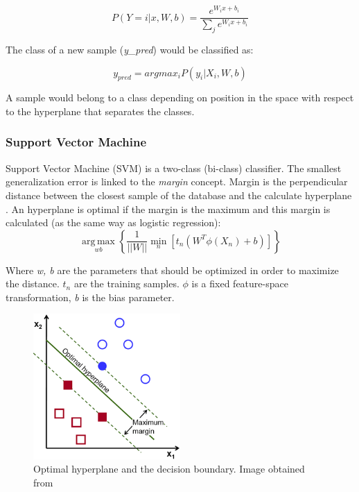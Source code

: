 \begin{equation}
P(Y=i|x,W,b) = \frac{e^{W_ix+b_i}}{\sum_j e^{W_ix+b_i}}
\end{equation}

The class of a new sample (\textit{y\_{pred}}) would be classified as:

\begin{equation}
y_{pred} = argmax_{i}P(y_i|X_i,W,b)
\end{equation}

A sample would belong to a class depending on position in the space with respect to the hyperplane that separates the classes.\\

\subsubsection{Support Vector Machine}
Support Vector Machine (SVM) is a two-class (bi-class) classifier. The smallest generalization error is linked to the \textit{margin} concept. Margin is the perpendicular distance between the closest sample of the database and the calculate hyperplane \cite{MachineLearning}. An hyperplane is optimal if the margin is the maximum and this margin is calculated (as the same way as logistic regression):\\

\begin{equation}
\underset{w b}{\operatorname{arg\,max}}\left \{ \frac{1}{||W||} \underset{n}{\operatorname{min}}[t_{n}(W^T \phi (X_n)+b)]   \right \}
\end{equation}


Where \textit{w, b} are the parameters that should be optimized in order to maximize the distance. \textit{$t_n$} are the training samples. $\phi$ is a fixed feature-space transformation, \textit{b} is the bias parameter.\\

\begin{figure}[htb]
\centering
\includegraphics[width=0.5\textwidth]{images_miscelaneus/svm.png}
\caption{Optimal hyperplane and the decision boundary. Image obtained from \cite{SVMimage}} \label{fig:SVM}
\end{figure}

